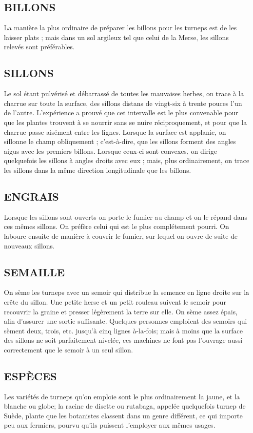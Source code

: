 \subsection{BILLONS}
La manière la plus ordinaire de préparer les billons pour les turneps est de les laisser plats ; mais dans un sol argileux tel que celui de la Merse, les sillons relevés sont préférables.
\subsection{SILLONS}
Le sol étant pulvérisé et débarrassé de toutes les mauvaises herbes, on trace à la charrue sur toute la surface, des sillons distans de vingt-six à trente pouces l'un de l'autre. L'expérience a prouvé que cet intervalle est le plus convenable pour que les plantes trouvent à se nourrir sans se nuire réciproquement, et pour que la charrue passe aisément entre les lignes. Lorsque la surface est applanie, on sillonne le champ obliquement ; c'est-à-dire, que les sillons forment des angles aigus avec les premiers billons. Lorsque ceux-ci sont convexes, on dirige quelquefois les sillons à angles droits avec eux ; mais, plus ordinairement, on trace les sillons dans la même direction longitudinale que les billons.
\subsection{ENGRAIS}
Lorsque les sillons sont ouverts on porte le fumier au champ et on le répand dans ces mêmes sillons. On préfère celui qui est le plus complétement pourri.\setcounter{page}{116} On laboure ensuite de manière à couvrir le fumier, sur lequel on ouvre de suite de nouveaux sillons.
\subsection{SEMAILLE}
On sème les turneps avec un semoir qui distribue la semence en ligne droite sur la crête du sillon. Une petite herse et un petit rouleau suivent le semoir pour recouvrir la graine et presser légèrement la terre sur elle. On sème assez épais, afin d'assurer une sortie suffisante. Quelques personnes emploient des semoirs qui sèment deux, trois, etc. jusqu'à cinq lignes à-la-fois; mais à moins que la surface des sillons ne soit parfaitement nivelée, ces machines ne font pas l'ouvrage aussi correctement que le semoir à un seul sillon.
\subsection{ESPÈCES}
Les variétés de turneps qu'on emploie sont le plus ordinairement la jaune, et la blanche ou globe; la racine de disette ou rutabaga, appelée quelquefois turnep de Suède, plante que les botanistes classent dans un genre différent, ce qui importe peu aux fermiers, pourvu qu'ils puissent l'employer aux mêmes usages.
